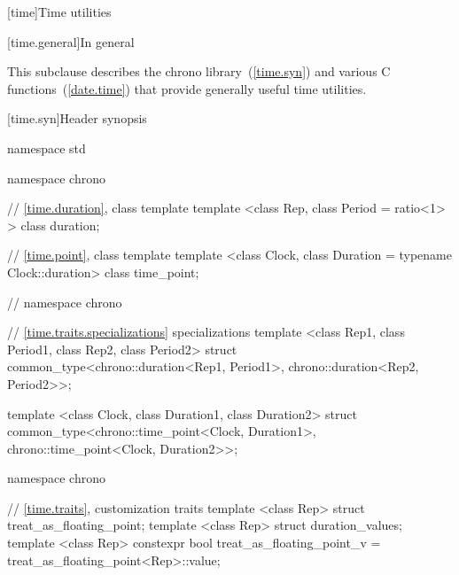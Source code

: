 [time]{Time utilities}

[time.general]{In general}

\pnum
{}%
This subclause describes the chrono library~(\ref{time.syn}) and various C
functions~(\ref{date.time}) that provide generally useful time
utilities.

[time.syn]{Header  synopsis}

\begin{codeblock}
namespace std {
namespace chrono {

// \ref{time.duration}, class template 
template <class Rep, class Period = ratio<1> > class duration;

// \ref{time.point}, class template 
template <class Clock, class Duration = typename Clock::duration> class time_point;
}  // namespace chrono

// \ref{time.traits.specializations}  specializations
template <class Rep1, class Period1, class Rep2, class Period2>
  struct common_type<chrono::duration<Rep1, Period1>, chrono::duration<Rep2, Period2>>;

template <class Clock, class Duration1, class Duration2>
  struct common_type<chrono::time_point<Clock, Duration1>, chrono::time_point<Clock, Duration2>>;

namespace chrono {

// \ref{time.traits}, customization traits
template <class Rep> struct treat_as_floating_point;
template <class Rep> struct duration_values;
template <class Rep> constexpr bool treat_as_floating_point_v
  = treat_as_floating_point<Rep>::value;

}}
\end{codeblock}
